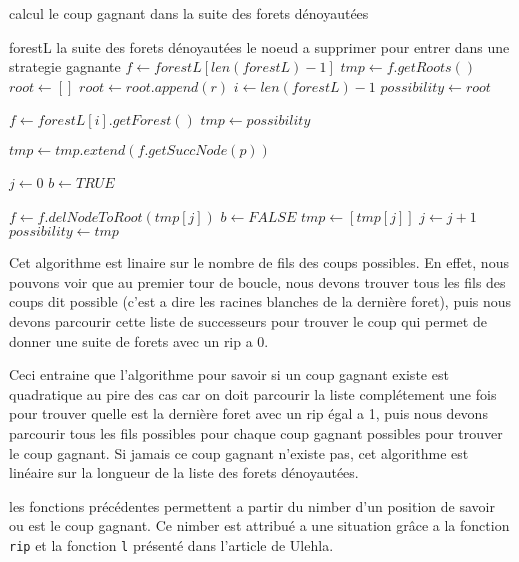 \begin{algorithm}[h]
  \caption{calcul le coup gagnant dans la suite des forets dénoyautées}
  \begin{algorithmic}
    \REQUIRE forestL la suite des forets dénoyautées
    \ENSURE le noeud a supprimer pour entrer dans une strategie gagnante
    \STATE $f \leftarrow forestL[len(forestL) - 1]$
    \STATE $tmp \leftarrow f.getRoots()$
    \STATE $root \leftarrow []$
          \STATE $root \leftarrow root.append(r)$
        \ENDIF
    \ENDFOR
    \STATE $i \leftarrow len(forestL) - 1$
    \STATE $possibility \leftarrow root$

      \STATE $f \leftarrow forestL[i].getForest()$
      \STATE $tmp \leftarrow possibility$

        \STATE $tmp \leftarrow tmp.extend(f.getSuccNode(p))$
      \ENDFOR

      \STATE $j \leftarrow 0$
      \STATE $b \leftarrow TRUE$

        \STATE $f \leftarrow f.delNodeToRoot(tmp[j])$
          \STATE $b \leftarrow FALSE$
          \STATE $tmp \leftarrow [tmp[j]]$
        \ENDIF
        \STATE $j \leftarrow j + 1$
      \ENDWHILE
      \STATE $possibility \leftarrow tmp$
    \ENDWHILE
  \end{algorithmic}
\end{algorithm}

Cet algorithme est linaire sur le nombre de fils des coups possibles. En effet, nous pouvons voir que au premier tour de boucle, nous devons trouver tous les fils des coups dit possible (c'est a dire les racines blanches de la dernière foret), puis nous devons parcourir cette liste de successeurs pour trouver le coup qui permet de donner une suite de forets avec un rip a 0.

Ceci entraine que l'algorithme pour savoir si un coup gagnant existe est quadratique au pire des cas car on doit parcourir la liste complétement une fois pour trouver quelle est la dernière foret avec un rip égal a 1, puis nous devons parcourir tous les fils possibles pour chaque coup gagnant possibles pour trouver le coup gagnant. Si jamais ce coup gagnant n'existe pas, cet algorithme est linéaire sur la longueur de la liste des forets dénoyautées.

les fonctions précédentes permettent a partir du nimber d'un position de savoir ou est le coup gagnant. Ce nimber est attribué a une situation grâce a la fonction \texttt{rip} et la fonction \texttt{l} présenté dans l'article de Ulehla.

